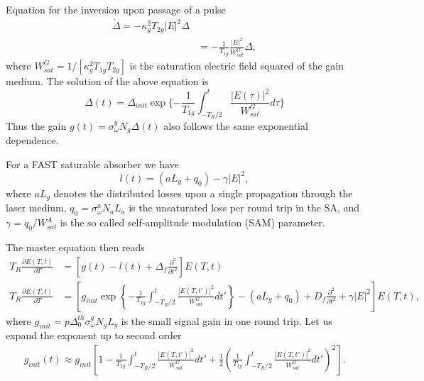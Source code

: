 \documentclass[preprint,secnumarabic,amssymb, nobibnotes, aip, prd]{revtex4-1}
\def\p{\partial}
\begin{document}
Equation for the inversion upon passage of a pulse 
\begin{align}
\dot \Delta = - \kappa_g^2T_{2g} |E|^2 \Delta  \nonumber \\
			&= - \frac{1}{T_{1g}}\frac{|E|^2}{W_{sat}^G}\Delta, 
\end{align}
where $W_{sat}^G = 1/[\kappa_g^2T_{1g}T_{2g}]$ is the saturation electric field squared of the gain medium. The solution of the above equation is 
\begin{equation}
\Delta(t) = \Delta_{init}\exp\{-\frac{1}{T_{1g}} \int_{-T_R/2}^{t} \frac{|E(\tau)|^2}{W_{sat}^G}d\tau\}
\end{equation}
Thus the gain $g(t) = \sigma_\omega^g N_g \Delta(t)$ also follows the same exponential dependence.  

For a FAST saturable absorber we have~\cite{haus1975theory}
\begin{equation}
l(t) = (aL_g+q_0) -\gamma |E|^2,
\end{equation}
where $aL_g$ denotes the distributed losses upon a single propagation through the laser medium, $q_0 = \sigma_\omega^a N_aL_a$ is the unsaturated loss per round trip in the SA, and $\gamma = q_0/W_{sat}^A$ is the so called self-amplitude modulation (SAM) parameter.



The master equation then reads
\begin{align}
\label{eq:master-equation}
T_R \frac{\p E(T,t)}{\p T} &= \left[g(t) - l(t) +\Delta_f \frac{\p^2}{\p t^2}\right]E(T,t) \nonumber \\
T_R \frac{\p E(T,t)}{\p T} &= \left[ g_{init}\exp\left \{-\frac{1}{T_{1g}} \int_{-T_R/2}^{t} \frac{|E(T,t')|^2}{W_{sat}^G}dt' \right \} - (aL_g+q_0)  +D_f \frac{\p^2}{\p t^2} +\gamma |E|^2\right]E(T,t),
\end{align}
where $ g_{init} =  p\Delta_0^{th} \sigma_\omega^g N_g  L_g$ is the small signal gain in one round trip. 
Let us expand the exponent up to second order
\begin{align}
g_{init}(t) \approx  g_{init}\left [ 1-\frac{1}{T_{1g}} \int_{-T_R/2}^{t} \frac{|E(T,t')|^2}{W_{sat}^G}dt' +\frac{1}{2} \left(\frac{1}{T_{1g}} \int_{-T_R/2}^{t} \frac{|E(T,t')|^2}{W_{sat}^G}dt'\right)^2 \right ].
\end{align}
\end{document}
